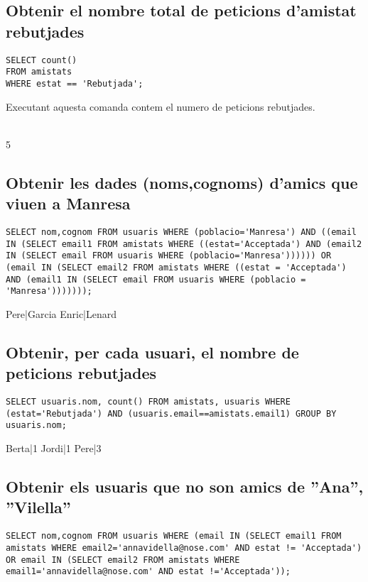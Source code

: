 \documentclass[11p]{article}
\begin{document}
\subsection{Obtenir el nombre total de peticions d’amistat rebutjades}

\begin{lstlisting}
SELECT count() 
FROM amistats 
WHERE estat == 'Rebutjada';

\end{lstlisting}

Executant aquesta comanda contem el numero de peticions rebutjades.\\\\
\centerline{5}

\subsection{Obtenir les dades (noms,cognoms) d’amics que viuen a Manresa}

\begin{lstlisting}
SELECT nom,cognom FROM usuaris WHERE (poblacio='Manresa') AND ((email IN (SELECT email1 FROM amistats WHERE ((estat='Acceptada') AND (email2 IN (SELECT email FROM usuaris WHERE (poblacio='Manresa')))))) OR (email IN (SELECT email2 FROM amistats WHERE ((estat = 'Acceptada') AND (email1 IN (SELECT email FROM usuaris WHERE (poblacio = 'Manresa')))))));
\end{lstlisting}

Pere|Garcia
Enric|Lenard

\subsection{Obtenir, per cada usuari, el nombre de peticions rebutjades}
\begin{lstlisting}
SELECT usuaris.nom, count() FROM amistats, usuaris WHERE (estat='Rebutjada') AND (usuaris.email==amistats.email1) GROUP BY usuaris.nom;
\end{lstlisting}

Berta|1
Jordi|1
Pere|3

\subsection{Obtenir els usuaris que no son amics de ”Ana”, ”Vilella”}
\begin{lstlisting}
SELECT nom,cognom FROM usuaris WHERE (email IN (SELECT email1 FROM amistats WHERE email2='annavidella@nose.com' AND estat != 'Acceptada') OR email IN (SELECT email2 FROM amistats WHERE email1='annavidella@nose.com' AND estat !='Acceptada'));
\end{lstlisting}
\end{document}

